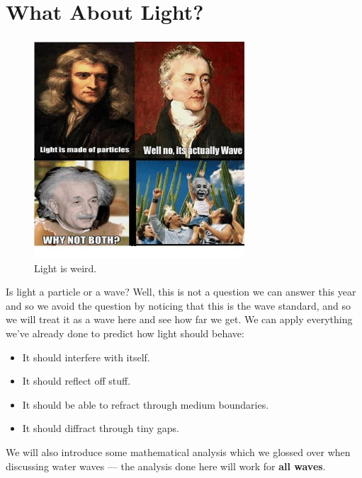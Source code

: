 \documentclass[a4paper]{amsbook}
\newcommand\capcite[1]{}
\begin{document}
\section{What About Light?}
\begin{figure}
  \centering
  \includegraphics[width=0.7\textwidth]{lightisweird}
  \caption{Light is weird. \capcite{https://pics.onsizzle.com/Instagram-109383.png}\label{fig:lightisweird}}
\end{figure}
Is light a particle or a wave? Well, this is not a question we can answer this year and so we avoid the question by noticing that this
is the wave standard, and so we will treat it as a wave here and see how far we get. We can apply everything we've already done to predict
how light should behave:
\begin{itemize}
  \item It should interfere with itself.
  \item It should reflect off stuff.
  \item It should be able to refract through medium boundaries.
  \item It should diffract through tiny gaps.
\end{itemize}

We will also introduce some mathematical analysis which we glossed over when discussing water waves --- the analysis
done here will work for \textbf{all waves}.
\end{document}

